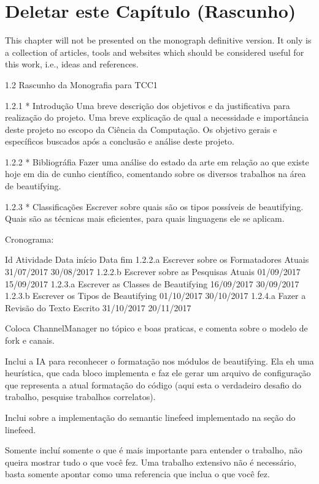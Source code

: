 

\chapter{Deletar este Capítulo (Rascunho)}

This chapter will not be presented on the monograph definitive version.
It only is a collection of articles,
tools and websites which should be considered useful for this work, i.e., ideas and references.

1.2      Rascunho da Monografia para TCC1

1.2.1    * Introdução       Uma breve descrição dos objetivos e da
           justificativa para realização do projeto. Uma breve explicação de
           qual a necessidade e importância deste projeto no escopo da
           Ciência da Computação. Os objetivo gerais e específicos buscados
           após a conclusão e análise deste projeto.

1.2.2    * Bibliográfia     Fazer uma análise do estado da arte em relação
         ao que existe hoje em dia de cunho científico, comentando sobre os
         diversos trabalhos na área de beautifying.

1.2.3    * Classificações   Escrever sobre quais são os tipos possíveis de
         beautifying. Quais são as técnicas mais eficientes, para quais
         linguagens ele se aplicam.

Cronograma:

Id      Atividade                               Data início    Data fim
1.2.2.a Escrever sobre os Formatadores Atuais   31/07/2017     30/08/2017
1.2.2.b Escrever sobre as Pesquisas Atuais      01/09/2017     15/09/2017
1.2.3.a Escrever as Classes de Beautifying      16/09/2017     30/09/2017
1.2.3.b Escrever os Tipos de Beautifying        01/10/2017     30/10/2017
1.2.4.a Fazer a Revisão do Texto Escrito        31/10/2017     20/11/2017

Coloca ChannelManager no tópico e boas praticas, e comenta sobre o modelo de
fork e canais.

Inclui a IA para reconhecer o formatação nos módulos de beautifying. Ela eh
uma heurística, que cada bloco implementa e faz ele gerar um arquivo de
configuração que representa a atual formatação do código (aqui esta o
verdadeiro desafio do trabalho, pesquise trabalhos correlatos).

Inclui sobre a implementação  do semantic linefeed implementado na seção do
linefeed.

Somente incluí somente o que é mais importante para entender o trabalho, não
queira mostrar tudo o que você fez. Uma trabalho extensivo não é necessário,
basta somente apontar como uma referencia que inclua o que você fez.

